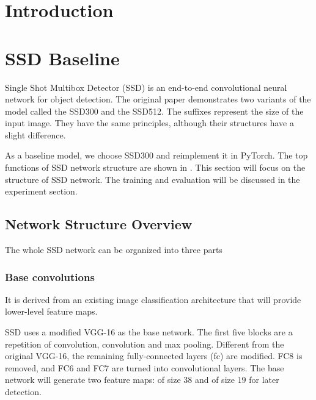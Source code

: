 \documentclass[journal,conference]{IEEEtran}
\begin{document}
\IEEEpeerreviewmaketitle



\section{Introduction}


\section{SSD Baseline}
Single Shot Multibox Detector (SSD) is an end-to-end convolutional neural network for object detection. The original paper \cite{ssd} demonstrates two variants of the model called the SSD300 and the SSD512. The suffixes represent the size of the input image. They have the same principles, although their structures have a slight difference.

As a baseline model, we choose SSD300 and reimplement it in PyTorch. The top functions of SSD network structure are shown in . This section will focus on the structure of SSD network. The training and evaluation will be discussed in the experiment section.


\subsection{Network Structure Overview}
The whole SSD network can be organized into three parts

\subsubsection{Base convolutions}
It is derived from an existing image classification architecture that will provide lower-level feature maps.

SSD uses a modified VGG-16 as the base network. The first five blocks are a repetition of convolution, convolution and max pooling. Different from the original VGG-16, the remaining fully-connected layers (fc) are modified. FC8 is removed, and FC6 and FC7 are turned into convolutional layers. The base network will generate two feature maps:  of size $38$ and  of size $19$ for later detection.
\end{document}
